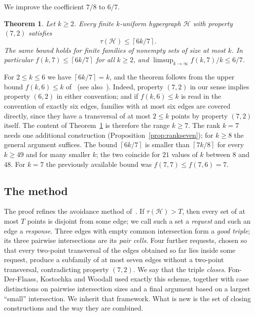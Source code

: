 \documentclass[11pt]{article}
\numberwithin{equation}{section}
\newtheorem{theorem}{Theorem}[section]
\theoremstyle{definition}
\theoremstyle{remark}
\newcommand{\HH}{\mathcal H}
\newcommand{\ceil}[1]{\left\lceil #1\right\rceil}
\begin{document}
We improve the coefficient $7/8$ to $6/7$.

\begin{theorem}\label{thm:main}
Let $k\ge2$. Every finite $k$-uniform hypergraph $\HH$ with property
$(7,2)$ satisfies
\[
 \tau(\HH)\le\ceil{6k/7}.
\]
The same bound holds for finite families of nonempty sets of size at
most $k$. In particular $f(k,7)\le\ceil{6k/7}$ for all $k\ge2$, and
$\limsup_{k\to\infty}f(k,7)/k\le6/7$.
\end{theorem}

For $2\le k\le6$ we have $\ceil{6k/7}=k$, and the theorem follows from
the upper bound $f(k,6)\le k$ of~\cite{EFKT} (see also~\cite[Section~1]{FKW}).
Indeed, property $(7,2)$ in our sense implies property $(6,2)$ in either
convention; and if $f(k,6)\le k$ is read in the convention of exactly six
edges, families with at most six edges are covered directly, since they
have a transversal of at most $2\le k$ points by property $(7,2)$ itself. The content of
Theorem~\ref{thm:main} is therefore the range $k\ge7$. The rank $k=7$
needs one additional construction (Proposition~\ref{prop:rankseven}); for
$k\ge8$ the general argument suffices. The bound $\ceil{6k/7}$ is smaller
than $\ceil{7k/8}$ for every $k\ge49$ and for many smaller $k$; the two
coincide for $21$ values of $k$ between $8$ and $48$. For $k=7$ the
previously available bound was $f(7,7)\le f(7,6)=7$.

\subsection*{The method}
The proof refines the avoidance method of~\cite{FKW}. If
$\tau(\HH)>T$, then every set of at most $T$ points is disjoint from
some edge; we call such a set a \emph{request} and such an edge a
\emph{response}. Three edges with empty common intersection form a
\emph{good triple}; its three pairwise intersections are its \emph{pair
cells}. Four further requests, chosen so that every two-point
transversal of the edges obtained so far lies inside some request,
produce a subfamily of at most seven edges without a two-point
transversal, contradicting property $(7,2)$. We say that the triple
\emph{closes}. Fon-Der-Flaass, Kostochka and Woodall used exactly this
scheme, together with case distinctions on pairwise intersection sizes
and a final argument based on a largest ``small'' intersection. We
inherit that framework. What is new is the set of closing constructions
and the way they are combined.
\end{document}
